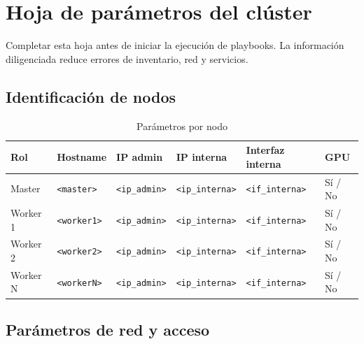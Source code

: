 \chapter{Hoja de parámetros del clúster}
\label{chap:hoja_parametros}

Completar esta hoja antes de iniciar la ejecución de playbooks. La información diligenciada reduce errores de inventario, red y servicios.

\section{Identificación de nodos}

\begin{table}[H]
\centering
\small
\caption{Parámetros por nodo}
\label{tab:parametros_nodos}
\begin{tabular}{|p{2.3cm}|p{2.5cm}|p{2.8cm}|p{2.8cm}|p{2.3cm}|p{2.0cm}|}
\hline
\textbf{Rol} & \textbf{Hostname} & \textbf{IP admin} & \textbf{IP interna} & \textbf{Interfaz interna} & \textbf{GPU} \\
\hline
Master & \texttt{\textless master\textgreater} & \texttt{\textless ip\_admin\textgreater} & \texttt{\textless ip\_interna\textgreater} & \texttt{\textless if\_interna\textgreater} & Sí / No \\
\hline
Worker 1 & \texttt{\textless worker1\textgreater} & \texttt{\textless ip\_admin\textgreater} & \texttt{\textless ip\_interna\textgreater} & \texttt{\textless if\_interna\textgreater} & Sí / No \\
\hline
Worker 2 & \texttt{\textless worker2\textgreater} & \texttt{\textless ip\_admin\textgreater} & \texttt{\textless ip\_interna\textgreater} & \texttt{\textless if\_interna\textgreater} & Sí / No \\
\hline
Worker N & \texttt{\textless workerN\textgreater} & \texttt{\textless ip\_admin\textgreater} & \texttt{\textless ip\_interna\textgreater} & \texttt{\textless if\_interna\textgreater} & Sí / No \\
\hline
\end{tabular}
\end{table}

\section{Parámetros de red y acceso}

